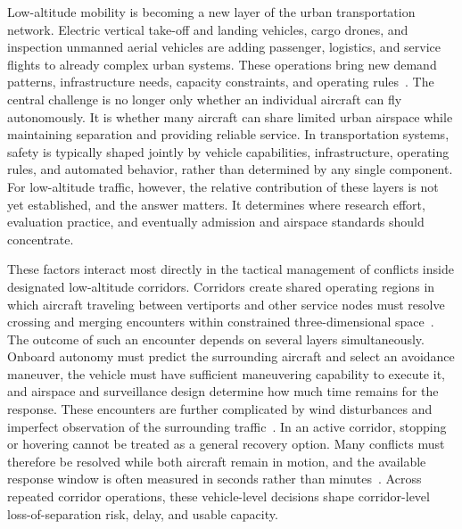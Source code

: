 \documentclass[11pt]{article}
\theoremstyle{plain}
\theoremstyle{definition}
\begin{document}
Low-altitude mobility is becoming a new layer of the urban
transportation network. Electric vertical take-off and landing vehicles,
cargo drones, and inspection unmanned aerial vehicles are adding
passenger, logistics, and service flights to already complex urban
systems. These operations bring new demand patterns, infrastructure
needs, capacity constraints, and operating rules~\citep{coppola2024uam,wang2023uam,pak2024uam}. The central challenge is no longer only whether an individual aircraft can fly autonomously. It is whether many aircraft can share limited urban airspace while maintaining separation and providing reliable service. In transportation systems, safety is typically shaped jointly by vehicle capabilities, infrastructure, operating rules, and automated behavior, rather than determined by any single component. For low-altitude traffic, however, the relative contribution of these layers is not yet established, and the answer matters. It determines where research effort, evaluation
practice, and eventually admission and airspace standards should
concentrate.

These factors interact most directly in the tactical management of
conflicts inside designated low-altitude corridors. Corridors create
shared operating regions in which aircraft traveling between vertiports
and other service nodes must resolve crossing and merging encounters
within constrained three-dimensional
space~\citep{tang2023strategic,wang2023quasidynamic}. The outcome of
such an encounter depends on several layers simultaneously. Onboard
autonomy must predict the surrounding aircraft and select an avoidance
maneuver, the vehicle must have sufficient maneuvering capability to
execute it, and airspace and surveillance design determine how much time
remains for the response. These encounters are further complicated by wind disturbances and imperfect observation of the surrounding traffic~\citep{nithya2024wind}. In an active corridor, stopping or hovering cannot be treated as a general recovery option. Many conflicts must therefore be resolved while both aircraft remain in motion, and the available response window is often measured in seconds rather than minutes~\citep{kuchar2000review,chen2024integrated}. Across repeated corridor operations, these vehicle-level decisions shape corridor-level loss-of-separation risk, delay, and usable capacity.
\end{document}
